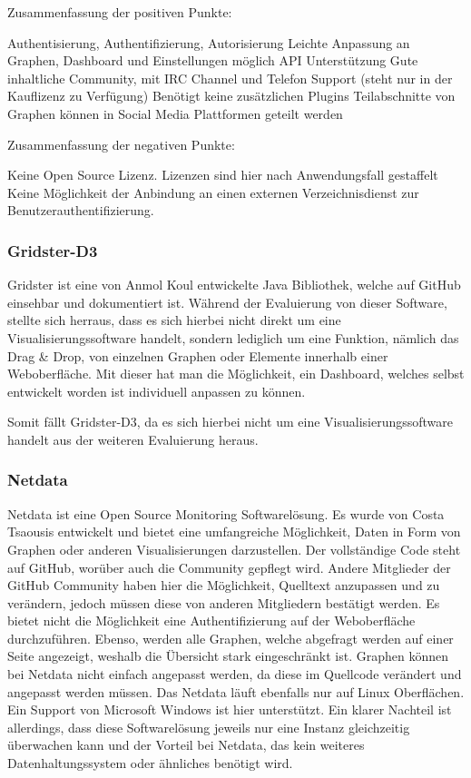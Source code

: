 Zusammenfassung der positiven Punkte:

\begin{outline}
  \1 Authentisierung, Authentifizierung, Autorisierung
  \1 Leichte Anpassung an Graphen, Dashboard und Einstellungen möglich
  \1 API Unterstützung
  \1 Gute inhaltliche Community, mit IRC Channel und Telefon Support (steht
  nur in der Kauflizenz zu Verfügung)
  \1 Benötigt keine zusätzlichen Plugins
  \1 Teilabschnitte von Graphen können in Social Media Plattformen geteilt
  werden
\end{outline}

Zusammenfassung der negativen Punkte:

\begin{outline}
  \1 Keine Open Source Lizenz. Lizenzen sind hier nach Anwendungsfall
  gestaffelt
  \1 Keine Möglichkeit der Anbindung an einen externen Verzeichnisdienst zur
  Benutzerauthentifizierung.
\end{outline}

\subsubsection{Gridster-D3}
\label{subsubsec:gridster-d3}
Gridster ist eine von Anmol Koul entwickelte Java Bibliothek, welche auf
\gls{GitHub} einsehbar und dokumentiert ist. Während der Evaluierung von dieser
Software, stellte sich herraus, dass es sich hierbei nicht direkt um eine
Visualisierungssoftware handelt, sondern lediglich um eine Funktion, nämlich
das Drag \& Drop, von einzelnen Graphen oder Elemente innerhalb einer
Weboberfläche. Mit dieser hat man die Möglichkeit, ein Dashboard, welches
selbst entwickelt worden ist individuell anpassen zu können.

Somit fällt Gridster-D3, da es sich hierbei nicht um eine
Visualisierungssoftware handelt aus der weiteren Evaluierung heraus.

\subsubsection{Netdata}
\label{subsubsec:netdata}
Netdata ist eine Open Source Monitoring Softwarelösung. Es wurde von Costa
Tsaousis entwickelt und bietet eine umfangreiche Möglichkeit, Daten in Form von
Graphen oder anderen Visualisierungen darzustellen. Der vollständige Code steht
auf GitHub, worüber auch die Community gepflegt wird. Andere Mitglieder der
GitHub Community haben hier die Möglichkeit, Quelltext anzupassen und zu
verändern, jedoch müssen diese von anderen Mitgliedern bestätigt werden. Es
bietet nicht die Möglichkeit eine Authentifizierung auf der Weboberfläche
durchzuführen. Ebenso, werden alle Graphen, welche abgefragt werden auf einer
Seite angezeigt, weshalb die Übersicht stark eingeschränkt ist. Graphen können
bei Netdata nicht einfach angepasst werden, da diese im Quellcode verändert und
angepasst werden müssen. Das Netdata läuft ebenfalls nur auf Linux Oberflächen.
Ein Support von Microsoft Windows ist hier unterstützt. Ein klarer Nachteil ist
allerdings, dass diese Softwarelösung jeweils nur eine Instanz gleichzeitig
überwachen kann und der Vorteil bei Netdata, das kein weiteres
Datenhaltungssystem oder ähnliches benötigt wird.

